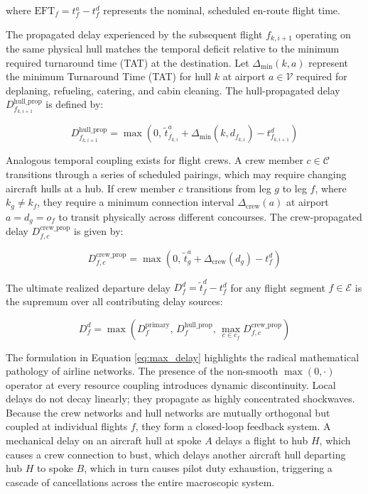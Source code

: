 \documentclass[11pt,a4paper]{book}
\begin{document}
where $\text{EFT}_f = t_f^a - t_f^d$ represents the nominal, scheduled en-route flight time. 

The propagated delay experienced by the subsequent flight $f_{k, i+1}$ operating on the same physical hull matches the temporal deficit relative to the minimum required turnaround time (TAT) at the destination. Let $\Delta_{\min}(k, a)$ represent the minimum Turnaround Time (TAT) for hull $k$ at airport $a \in \mathcal{V}$ required for deplaning, refueling, catering, and cabin cleaning. The hull-propagated delay $D_{f_{k, i+1}}^{\text{hull\_prop}}$ is defined by:

\begin{equation}
\label{eq:hull_prop}
D_{f_{k, i+1}}^{\text{hull\_prop}} = \max\left(0, \, \tilde{t}_{f_{k, i}}^a + \Delta_{\min}(k, d_{f_{k, i}}) - t_{f_{k, i+1}}^d\right)
\end{equation}

Analogous temporal coupling exists for flight crews. A crew member $c \in \mathcal{C}$ transitions through a series of scheduled pairings, which may require changing aircraft hulls at a hub. If crew member $c$ transitions from leg $g$ to leg $f$, where $k_g \neq k_f$, they require a minimum connection interval $\Delta_{\text{crew}}(a)$ at airport $a = d_g = o_f$ to transit physically across different concourses. The crew-propagated delay $D_{f, c}^{\text{crew\_prop}}$ is given by:

\begin{equation}
\label{eq:crew_prop}
D_{f, c}^{\text{crew\_prop}} = \max\left(0, \, \tilde{t}_{g}^a + \Delta_{\text{crew}}(d_g) - t_{f}^d\right)
\end{equation}

The ultimate realized departure delay $D_f^d = \tilde{t}_f^d - t_f^d$ for any flight segment $f \in \mathcal{E}$ is the supremum over all contributing delay sources:

\begin{equation}
\label{eq:max_delay}
D_f^d = \max\left( D_f^{\text{primary}}, \, D_{f}^{\text{hull\_prop}}, \, \max_{c \in c_f} D_{f, c}^{\text{crew\_prop}} \right)
\end{equation}

The formulation in Equation \ref{eq:max_delay} highlights the radical mathematical pathology of airline networks. The presence of the non-smooth $\max(0, \cdot)$ operator at every resource coupling introduces dynamic discontinuity. Local delays do not decay linearly; they propagate as highly concentrated shockwaves. Because the crew networks and hull networks are mutually orthogonal but coupled at individual flights $f$, they form a closed-loop feedback system. A mechanical delay on an aircraft hull at spoke $A$ delays a flight to hub $H$, which causes a crew connection to bust, which delays another aircraft hull departing hub $H$ to spoke $B$, which in turn causes pilot duty exhaustion, triggering a cascade of cancellations across the entire macroscopic system.
\end{document}
